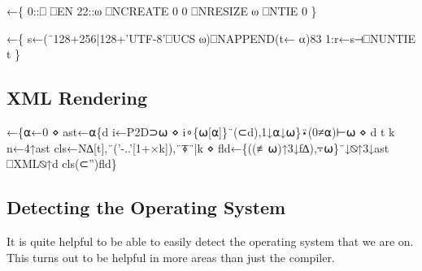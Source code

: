 \documentclass{article}%
\begin{document}
\nwenddocs{}\endmoddef\nwstartdeflinemarkup{}\nwenddeflinemarkup
{}←\{
        0::⎕ ⎕EN
        22::⍵ ⎕NCREATE 0
        0 ⎕NRESIZE ⍵ ⎕NTIE 0
\}

←\{
        s←(¯128+256|128+'UTF-8'⎕UCS ⍵)⎕NAPPEND(t← ⍺)83
        1:r←s⊣⎕NUNTIE t
\}
\eatline
{}\nwendcode{}\nwdocspar
\subsection{XML Rendering}

\nwenddocs{}\endmoddef\nwstartdeflinemarkup{}\nwenddeflinemarkup
{}←\{⍺←0 ⋄ ast←⍺\{d i←P2D⊃⍵ ⋄ i∘\{⍵[⍺]\}¨(⊂d),1↓⍺↓⍵\}⍣(0≠⍺)⊢⍵ ⋄ d t k n←4↑ast
        cls←N∆[t],¨('-..'[1+×k]),¨⍕¨|k ⋄ fld←\{((≢⍵)↑3↓f∆),⍪⍵\}¨↓⍉↑3↓ast
        ⎕XML⍉↑d cls(⊂'')fld\}
\eatline
{}\nwendcode{}\nwdocspar
\subsection{Detecting the Operating System}

It is quite helpful to be able to easily detect the operating system
that we are on.
This turns out to be helpful in more areas than just the compiler.
\end{document}
